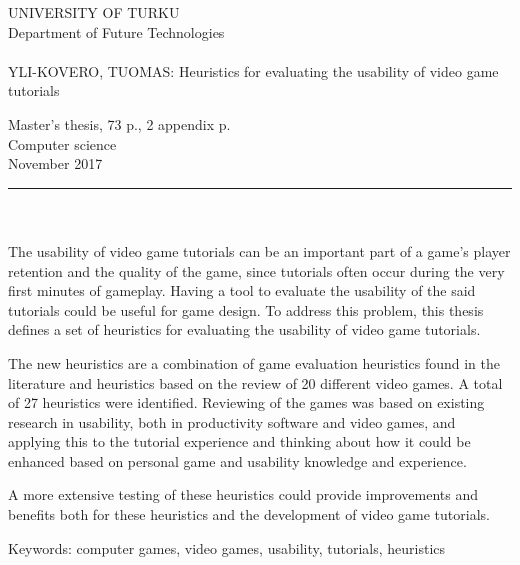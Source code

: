 \documentclass[12pt, a4paper]{report}
\begin{document}
\begin{minipage}{15cm}
	\pagestyle{empty}
	\noindent
	UNIVERSITY OF TURKU\\
	Department of Future Technologies\\
	\\
	YLI-KOVERO, TUOMAS: Heuristics for evaluating the usability of video game tutorials
	
	Master's thesis, 73 p., 2 appendix p.\\
	Computer science\\
	November 2017\\

	\rule{\textwidth}{.2mm}\\
	\\
	The usability of video game tutorials can be an important part of a game's player retention and the quality of the game, since tutorials often occur during the very first minutes of gameplay. Having a tool to evaluate the usability of the said tutorials could be useful for game design. To address this problem, this thesis defines a set of heuristics for evaluating the usability of video game tutorials.
	
	\vspace{4mm}\noindent The new heuristics are a combination of game evaluation heuristics found in the literature and heuristics based on the review of 20 different video games. A total of 27 heuristics were identified. Reviewing of the games was based on existing research in usability, both in productivity software and video games, and applying this to the tutorial experience and thinking about how it could be enhanced based on personal game and usability knowledge and experience.
	
	\vspace{4mm}\noindent A more extensive testing of these heuristics could provide improvements and benefits both for these heuristics and the development of video game tutorials. 
	
	\vspace{4mm}\noindent Keywords: computer games, video games, usability, tutorials, heuristics
	
\end{minipage}
\end{document}
